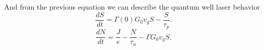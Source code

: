 And from the previous equation we can describe the quantum well laser behavior
\begin{equation*}
	\frac{d S}{d t} = \Gamma(0) G_0 v_g S - \frac{S}{\tau_p}. 
\end{equation*}
\begin{equation*}
	\frac{d N}{d t} = \frac{J}{e} - \frac{N}{\tau_n} - \Gamma G_0 v_g S.
\end{equation*}